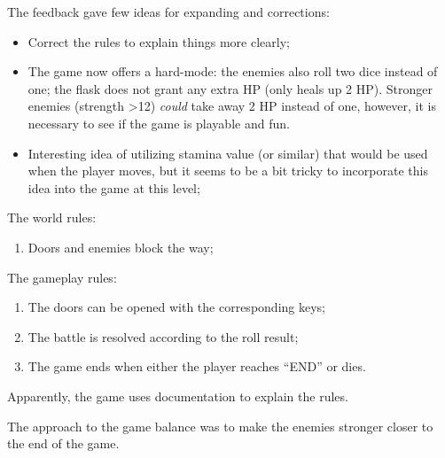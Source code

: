 \documentclass[landscape]{article}
\begin{document}
The feedback gave few ideas for expanding and corrections:

\begin{itemize}

  \item Correct the rules to explain things more clearly;

  \item The game now offers a hard-mode: the enemies also roll two dice instead
    of one; the flask does not grant any extra HP (only heals up 2 HP). Stronger
    enemies (strength \textgreater12) \textit{could} take away 2 HP instead of one, however,
    it is necessary to see if the game is playable and fun.

  \item Interesting idea of utilizing stamina value (or similar) that would be
    used when the player moves, but it seems to be a bit tricky to incorporate
    this idea into the game at this level;

\end{itemize}

The world rules:

\begin{enumerate}

  \item Doors and enemies block the way;

\end{enumerate}

The gameplay rules:

\begin{enumerate}

  \item The doors can be opened with the corresponding keys;

  \item The battle is resolved according to the roll result;

  \item The game ends when either the player reaches ``END'' or dies.

\end{enumerate}

Apparently, the game uses documentation to explain the rules.

The approach to the game balance was to make the enemies stronger closer to the
end of the game.


\begin{figure}[ht]
  \centering
  \noindent{}
\end{figure}
\end{document}
